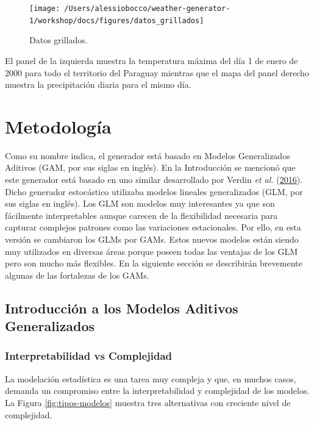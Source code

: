 \documentclass[
  12pt]{article}
\begin{document}
\begin{figure}[H]

{\centering \texttt{[image: /Users/alessiobocco/weather-generator-1/workshop/docs/figures/datos\_grillados]} 

}

\caption{Datos grillados.}\label{fig:datos-grillados}
\end{figure}

El panel de la izquierda muestra la temperatura máxima del día 1 de enero de 2000 para todo el territorio del Paraguay mientras que el mapa del panel derecho muestra la precipitación diaria para el mismo día.

\hypertarget{metodologuxeda}{%
\section{Metodología}\label{metodologuxeda}}

Como su nombre indica, el generador está basado en Modelos Generalizados Aditivos (GAM, por sus siglas en inglés). En la Introducción se mencionó que este generador está basado en uno similar desarrollado por Verdin \emph{et al.} (\protect\hyperlink{ref-RN3540}{2016}). Dicho generador estocástico utilizaba modelos lineales generalizados (GLM, por sus siglas en inglés). Los GLM son modelos muy interesantes ya que son fácilmente interpretables aunque carecen de la flexibilidad necesaria para capturar complejos patrones como las variaciones estacionales. Por ello, en esta versión se cambiaron los GLMs por GAMs. Estos nuevos modelos están siendo muy utilizados en diversas áreas porque poseen todas las ventajas de los GLM pero son mucho más flexibles. En la siguiente sección se describirán brevemente algunas de las fortalezas de los GAMs.

\hypertarget{introducciuxf3n-a-los-modelos-aditivos-generalizados}{%
\subsection{Introducción a los Modelos Aditivos Generalizados}\label{introducciuxf3n-a-los-modelos-aditivos-generalizados}}

\hypertarget{interpretabilidad-vs-complejidad}{%
\subsubsection{Interpretabilidad vs Complejidad}\label{interpretabilidad-vs-complejidad}}

La modelación estadística es una tarea muy compleja y que, en muchos casos, demanda un compromiso entre la interpretabilidad y complejidad de los modelos. La Figura \ref{fig:tipos-modelos} muestra tres alternativas con creciente nivel de complejidad.
\end{document}
